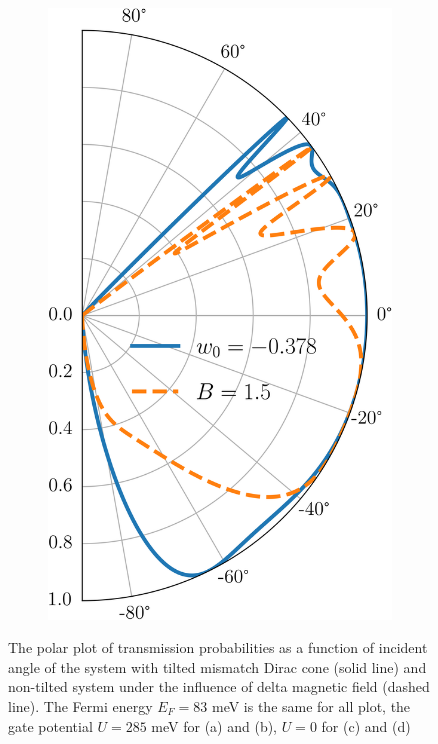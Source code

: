\begin{figure}[H]
\begin{subfigure}[b]{0.3\linewidth}
            \includegraphics[width = \linewidth]{fig/pseudo B field/Ef0.0832 U0 B1.5 w-0.378.png}
            \caption{}
            \label{fig:pseudo4}
        \end{subfigure}
        \caption{The polar plot of transmission probabilities as a function of incident angle of the system with tilted mismatch Dirac cone 
                (solid line) and non-tilted system under the influence of delta magnetic field (dashed line). The Fermi energy $E_F = 83$ 
                meV is the same for all plot, the gate potential $U = 285$ meV for (a) and (b), $U = 0$ for (c) and (d) }
        \label{fig:pseudo}
    \end{figure}




    
